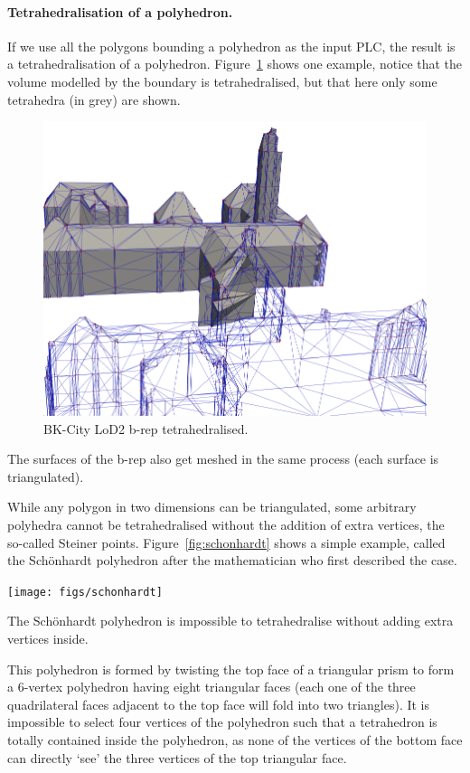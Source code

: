 \paragraph*{Tetrahedralisation of a polyhedron.}

If we use all the polygons bounding a polyhedron as the input PLC, the result is a tetrahedralisation of a polyhedron.
Figure~\ref{fig:meshing} shows one example, notice that the volume modelled by the boundary is tetrahedralised, but that here only some tetrahedra (in grey) are shown. 
\begin{figure}
  \centering
  \includegraphics[width=\linewidth]{figs/mesh1}
  \caption{BK-City LoD2 b-rep tetrahedralised.}%
\label{fig:meshing}
\end{figure}
The surfaces of the b-rep also get meshed in the same process (each surface is triangulated).

While any polygon in two dimensions can be triangulated, some arbitrary polyhedra cannot be tetrahedralised without the addition of extra vertices, the so-called Steiner points. 
Figure~\ref{fig:schonhardt} shows a simple example, called the Sch\"onhardt polyhedron after the mathematician who first described the case.
\begin{marginfigure}
  \centering
  \texttt{[image: figs/schonhardt]}
  \caption[The Sch\"onhardt polyhedron]{The Sch\"onhardt polyhedron is impossible to tetrahedralise without adding extra vertices inside.}%
\label{fig:schonhardt}
\end{marginfigure}
This polyhedron is formed by twisting the top face of a triangular prism to form a 6-vertex polyhedron having eight triangular faces (each one of the three quadrilateral faces adjacent to the top face will fold into two triangles). 
It is impossible to select four vertices of the polyhedron such that a tetrahedron is totally contained inside the polyhedron, as none of the vertices of the bottom face can directly `see' the three vertices of the top triangular face.

